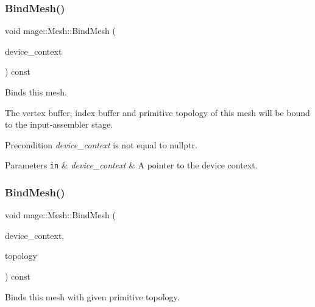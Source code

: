 \subsubsection{\texorpdfstring{Bind\+Mesh()}{BindMesh()}\hspace{0.1cm}{\footnotesize\ttfamily [1/2]}}
{\footnotesize\ttfamily void mage\+::\+Mesh\+::\+Bind\+Mesh (\begin{DoxyParamCaption}\item[{I\+D3\+D11\+Device\+Context2 $\ast$}]{device\+\_\+context }\end{DoxyParamCaption}) const\hspace{0.3cm}{\ttfamily [noexcept]}}

Binds this mesh.

The vertex buffer, index buffer and primitive topology of this mesh will be bound to the input-\/assembler stage.

\begin{DoxyPrecond}{Precondition}
{\itshape device\+\_\+context} is not equal to {\ttfamily nullptr}. 
\end{DoxyPrecond}

\begin{DoxyParams}[1]{Parameters}
\mbox{\tt in}  & {\em device\+\_\+context} & A pointer to the device context. \\
\hline
\end{DoxyParams}
\hypertarget{classmage_1_1_mesh_ace9f6a77e326a9ec8519428a28fa7b51}{}\label{classmage_1_1_mesh_ace9f6a77e326a9ec8519428a28fa7b51} 
\subsubsection{\texorpdfstring{Bind\+Mesh()}{BindMesh()}\hspace{0.1cm}{\footnotesize\ttfamily [2/2]}}
{\footnotesize\ttfamily void mage\+::\+Mesh\+::\+Bind\+Mesh (\begin{DoxyParamCaption}\item[{I\+D3\+D11\+Device\+Context2 $\ast$}]{device\+\_\+context,  }\item[{D3\+D11\+\_\+\+P\+R\+I\+M\+I\+T\+I\+V\+E\+\_\+\+T\+O\+P\+O\+L\+O\+GY}]{topology }\end{DoxyParamCaption}) const\hspace{0.3cm}{\ttfamily [noexcept]}}

Binds this mesh with given primitive topology.

